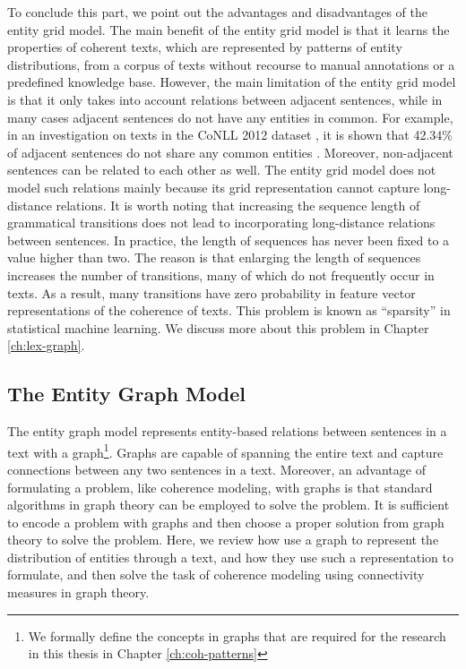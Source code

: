 To conclude this part, we point out the advantages and disadvantages of the entity grid model. 
The main benefit of the entity grid model is that it learns the properties of coherent texts, which are represented by patterns of entity distributions, from a corpus of texts without recourse to manual annotations or a predefined knowledge base. 
However, the main limitation of the entity grid model is that it only takes into account relations between adjacent sentences, while in many cases adjacent sentences do not have any entities in common. 
For example, in an investigation on texts in the CoNLL 2012 dataset \cite{pradhan12}, it is shown that 42.34\% of adjacent sentences do not share any common entities \cite{zhangmuyu15}. 
Moreover, non-adjacent sentences can be related to each other as well. 
The entity grid model does not model such relations mainly because its grid representation cannot capture long-distance relations.  
It is worth noting that increasing the sequence length of grammatical transitions does not lead to incorporating long-distance relations between sentences.  
In practice, the length of sequences has never been fixed to a value higher than two. 
The reason is that enlarging the length of sequences increases the number of transitions, many of which do not frequently occur in texts. 
As a result, many transitions have zero probability in feature vector representations of the coherence of texts. 
This problem is known as ``sparsity'' in statistical machine learning. 
We discuss more about this problem in Chapter \ref{ch:lex-graph}. 

\subsection{The Entity Graph Model}
\label{sec:ent_graph}

The entity graph model \cite{guinaudeau13} represents entity-based relations between sentences in a text with a graph\footnote{We formally define the concepts in graphs that are required for the research in this thesis in Chapter \ref{ch:coh-patterns}}. 
Graphs are capable of spanning the entire text and capture connections between any two sentences in a text. 
Moreover, an advantage of formulating a problem, like coherence modeling, with graphs is that standard algorithms in graph theory can be employed to solve the problem. 
It is sufficient to encode a problem with graphs and then choose a proper solution from graph theory to solve the problem. 
Here, we review how  use a graph to represent the distribution of entities through a text, and how they use such a representation to formulate, and then solve the task of coherence modeling using connectivity measures in graph theory.  

